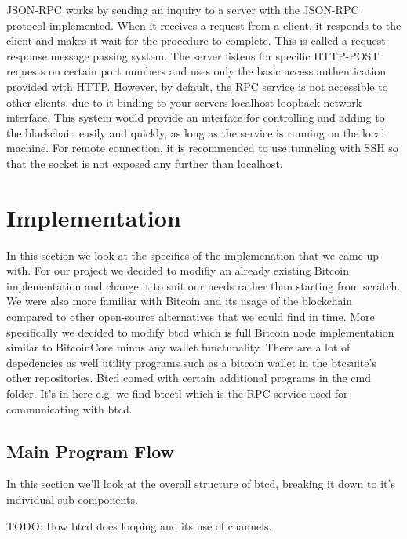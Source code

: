 \documentclass[11pt]{article}
\begin{document}
JSON-RPC works by sending an inquiry to a server with the JSON-RPC protocol implemented. When it receives a request from a client, it responds to the client and makes it wait for the procedure to complete. This is called a request-response message passing system. The server listens for specific HTTP-POST requests on certain port numbers and uses only the basic access authentication provided with HTTP. However, by default, the RPC service is not accessible to other clients, due to it binding to your servers localhost loopback network interface. This system would provide an interface for controlling and adding to the blockchain easily and quickly, as long as the service is running on the local machine. For remote connection, it is recommended to use tunneling with SSH so that the socket is not exposed any further than localhost. 

\section{Implementation}
In this section we look at the specifics of the implemenation that we came up with. For our project we decided to modifiy an already existing Bitcoin implementation and change it to suit our needs rather than starting from scratch. We were also more familiar with Bitcoin and its usage of the blockchain compared to other open-source alternatives that we could find in time. More specifically we decided to modify btcd\cite{btcsuite2015} which is full Bitcoin node implementation similar to BitcoinCore minus any wallet functunality. There are a lot of depedencies as well utility programs such as a bitcoin wallet in the btcsuite's other repositories. Btcd comed with certain additional programs in the cmd folder. It's in here e.g. we find btcctl which is the RPC-service used for communicating with btcd. 

\subsection{Main Program Flow}
In this section we'll look at the overall structure of btcd, breaking it down to it's individual sub-components. 


TODO: How btcd does looping and its use of channels.
\end{document}
